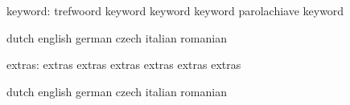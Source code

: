   keyword: trefwoord keyword
           keyword keyword
           parolachiave keyword

\stopconstants


\startconstants            dutch                     english
                           german                    czech
                           italian                   romanian

                   extras: extras                    extras
                           extras                    extras
                           extras                    extras

\stopconstants




\startvariables            dutch                     english
                           german                    czech
                           italian                   romanian

